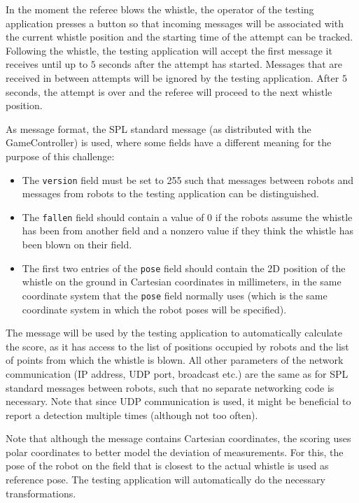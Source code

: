 \documentclass[12pt]{article}
\begin{document}
In the moment the referee blows the whistle, the operator of the testing application presses a button so that incoming messages will be associated with the current whistle position and the starting time of the attempt can be tracked. Following the whistle, the testing application will accept the first message it receives until up to \(5\) seconds after the attempt has started. Messages that are received in between attempts will be ignored by the testing application. After \(5\) seconds, the attempt is over and the referee will proceed to the next whistle position.

As message format, the SPL standard message (as distributed with the GameController) is used, where some fields have a different meaning for the purpose of this challenge:
\begin{itemize}
\item The \texttt{version} field must be set to 255 such that messages between robots and messages from robots to the testing application can be distinguished.
\item The \texttt{fallen} field should contain a value of 0 if the robots assume the whistle has been from another field and a nonzero value if they think the whistle has been blown on their field.
\item The first two entries of the \texttt{pose} field should contain the 2D position of the whistle on the ground in Cartesian coordinates in millimeters, in the same coordinate system that the \texttt{pose} field normally uses (which is the same coordinate system in which the robot poses will be specified).
\end{itemize}
The message will be used by the testing application to automatically calculate the score, as it has access to the list of positions occupied by robots and the list of points from which the whistle is blown. All other parameters of the network communication (IP address, UDP port, broadcast etc.) are the same as for SPL standard messages between robots, such that no separate networking code is necessary. Note that since UDP communication is used, it might be beneficial to report a detection multiple times (although not too often).

Note that although the message contains Cartesian coordinates, the scoring uses polar coordinates to better model the deviation of measurements. For this, the pose of the robot on the field that is closest to the actual whistle is used as reference pose. The testing application will automatically do the necessary transformations.
\end{document}
